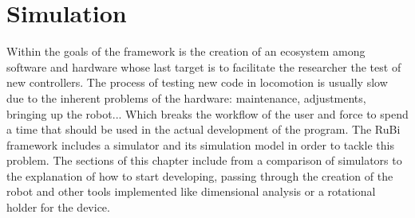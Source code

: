\chapter{Simulation} %
\label{cha:simulation}
Within the goals of the framework is the creation of an ecosystem among software and hardware whose last target is to facilitate the researcher the test of new controllers.
The process of testing new code in locomotion is usually slow due to the inherent problems of the hardware: maintenance, adjustments, bringing up the robot...
Which breaks the workflow of the user and force to spend a time that should be used in the actual development of the program.
The RuBi framework includes a simulator and its simulation model in order to tackle this problem.
The sections of this chapter include from a comparison of simulators to the explanation of how to start developing, passing through the creation of the robot and other tools implemented like dimensional analysis or a rotational holder for the device.








